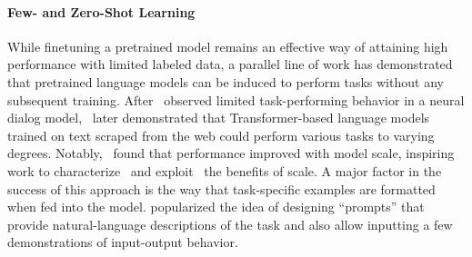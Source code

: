 \documentclass[twoside,11pt]{article}
\begin{document}
\paragraph{Few- and Zero-Shot Learning}
While finetuning a pretrained model remains an effective way of attaining high performance with limited labeled data, a parallel line of work has demonstrated that pretrained language models can be induced to perform tasks without any subsequent training.
After~\citet{vinyals2015neural} observed limited task-performing behavior in a neural dialog model,~\citet{radford2019language} later demonstrated that Transformer-based language models trained on text scraped from the web could perform various tasks to varying degrees.
Notably,~\citet{radford2019language} found that performance improved with model scale, inspiring work to characterize~\citep{kaplan2020scaling,hoffmann2022training} and exploit~\citep{shoeybi2019megatron,brown2020language,smith2022using,chowdhery2022palm,rae2021scaling,wang2021ernie,zeng2021pangu,zhang2022opt} the benefits of scale.
A major factor in the success of this approach is the way that task-specific examples are formatted when fed into the model.
\citet{brown2020language} popularized the idea of designing ``prompts'' that provide natural-language descriptions of the task and also allow inputting a few demonstrations of input-output behavior.
\end{document}
